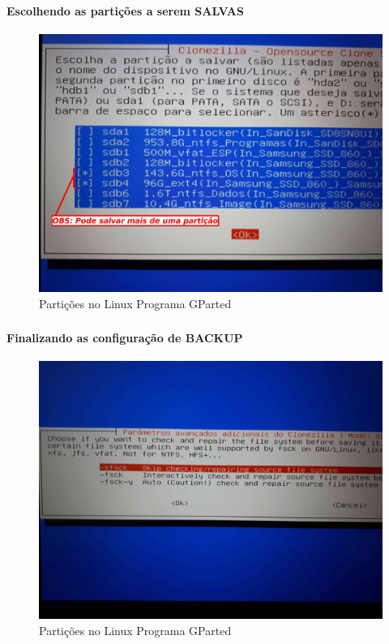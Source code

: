 \documentclass{beamer}
\begin{document}
\begin{frame}[plain,c]
   \frametitle{\insertsection}
    \framesubtitle{Escolhendo as partições a serem SALVAS}
    \begin{figure}[!h]
        \includegraphics[width=1\linewidth]{images/backup/bkp18.jpg}
        \caption{Partições no Linux Programa GParted}
    \end{figure}
\end{frame}

\begin{frame}[plain,c]
   \frametitle{\insertsection}
    \framesubtitle{Finalizando as configuração de BACKUP}
    \begin{figure}[!h]
        \includegraphics[width=1\linewidth]{images/backup/bkp19.jpg}
        \caption{Partições no Linux Programa GParted}
    \end{figure}
\end{frame}	
\end{document}
